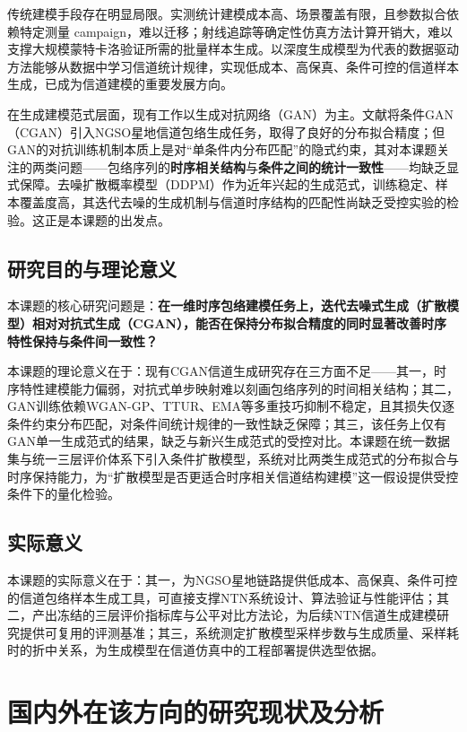 \documentclass[12pt, a4paper]{ctexart}
\begin{document}
传统建模手段存在明显局限。实测统计建模成本高、场景覆盖有限，且参数拟合依赖特定测量 campaign，难以迁移；射线追踪等确定性仿真方法计算开销大，难以支撑大规模蒙特卡洛验证所需的批量样本生成。以深度生成模型为代表的数据驱动方法能够从数据中学习信道统计规律，实现低成本、高保真、条件可控的信道样本生成，已成为信道建模的重要发展方向。

在生成建模范式层面，现有工作以生成对抗网络（GAN）为主。文献\cite{chen2026cgan}将条件GAN（CGAN）引入NGSO星地信道包络生成任务，取得了良好的分布拟合精度；但GAN的对抗训练机制本质上是对“单条件内分布匹配”的隐式约束，其对本课题关注的两类问题——包络序列的\textbf{时序相关结构}与\textbf{条件之间的统计一致性}——均缺乏显式保障。去噪扩散概率模型（DDPM）作为近年兴起的生成范式，训练稳定、样本覆盖度高，其迭代去噪的生成机制与信道时序结构的匹配性尚缺乏受控实验的检验。这正是本课题的出发点。

\subsection{研究目的与理论意义}
本课题的核心研究问题是：\textbf{在一维时序包络建模任务上，迭代去噪式生成（扩散模型）相对对抗式生成（CGAN），能否在保持分布拟合精度的同时显著改善时序特性保持与条件间一致性？}

本课题的理论意义在于：现有CGAN信道生成研究\cite{chen2026cgan}存在三方面不足——其一，时序特性建模能力偏弱，对抗式单步映射难以刻画包络序列的时间相关结构；其二，GAN训练依赖WGAN-GP、TTUR、EMA等多重技巧抑制不稳定，且其损失仅逐条件约束分布匹配，对条件间统计规律的一致性缺乏保障；其三，该任务上仅有GAN单一生成范式的结果，缺乏与新兴生成范式的受控对比。本课题在统一数据集与统一三层评价体系下引入条件扩散模型，系统对比两类生成范式的分布拟合与时序保持能力，为“扩散模型是否更适合时序相关信道结构建模”这一假设提供受控条件下的量化检验。

\subsection{实际意义}
本课题的实际意义在于：其一，为NGSO星地链路提供低成本、高保真、条件可控的信道包络样本生成工具，可直接支撑NTN系统设计、算法验证与性能评估；其二，产出冻结的三层评价指标库与公平对比方法论，为后续NTN信道生成建模研究提供可复用的评测基准；其三，系统测定扩散模型采样步数与生成质量、采样耗时的折中关系，为生成模型在信道仿真中的工程部署提供选型依据。

\section{国内外在该方向的研究现状及分析}
\end{document}

